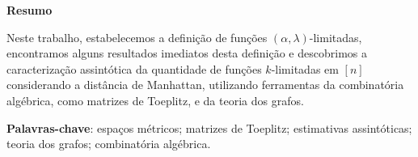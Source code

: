 \begin{center}
  \large \textbf{Resumo}
\end{center}
\vspace{1cm}
\par Neste trabalho, estabelecemos a definição de funções $(\alpha, \lambda)$-limitadas, encontramos alguns resultados imediatos desta definição e descobrimos a caracterização assintótica da quantidade de funções $k$-limitadas em $[n]$ considerando a distância de Manhattan, utilizando ferramentas da combinatória algébrica, como matrizes de Toeplitz, e da teoria dos grafos.

\vspace{1cm}

\begin{raggedleft}
  \textbf{Palavras-chave}: espaços métricos; matrizes de Toeplitz; estimativas assintóticas; teoria dos grafos; combinatória algébrica.
\end{raggedleft}
